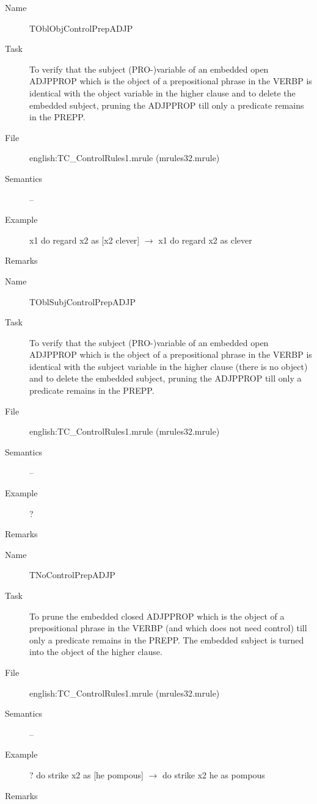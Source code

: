 \begin{description}
\vspace{1 cm}
\begin{description}
\item[Name]   TOblObjControlPrepADJP
\item[Task] To verify that  the subject (PRO-)variable of an embedded 
open ADJPPROP which is the object of a prepositional phrase in the VERBP is 
identical with the object variable in the higher clause 
and to delete the embedded subject, pruning the ADJPPROP till only a predicate 
remains in the PREPP. 
\item[File] english:TC\_ControlRules1.mrule (mrules32.mrule)
\item[Semantics] --
\item[Example] x1 do regard x2 as [x2 clever] $\rightarrow$ x1 do regard x2 as 
clever
\item[Remarks] 
\end{description}

\vspace{1 cm}
\begin{description}
\item[Name] TOblSubjControlPrepADJP
\item[Task] To verify that  the subject (PRO-)variable of an embedded 
open ADJPPROP which is the object of a prepositional phrase in the VERBP is 
identical with the subject variable in the higher clause (there is no object)
and to delete the embedded subject, pruning the ADJPPROP till only a predicate 
remains in the PREPP. 
\item[File] english:TC\_ControlRules1.mrule (mrules32.mrule)
\item[Semantics] --
\item[Example] ?
\item[Remarks] 
\end{description}

\vspace{1 cm}
\begin{description}
\item[Name]   TNoControlPrepADJP
\item[Task] To prune the embedded closed ADJPPROP which is the object of a 
prepositional phrase in the VERBP 
(and which does not need control) 
till only a predicate remains in the PREPP. The embedded subject is turned 
into the object of the higher clause.
\item[File] english:TC\_ControlRules1.mrule (mrules32.mrule)
\item[Semantics] --
\item[Example] ? do strike x2 as [he pompous] $\rightarrow$ do strike x2 he as 
pompous
\item[Remarks] 
\end{description}


\end{description}
